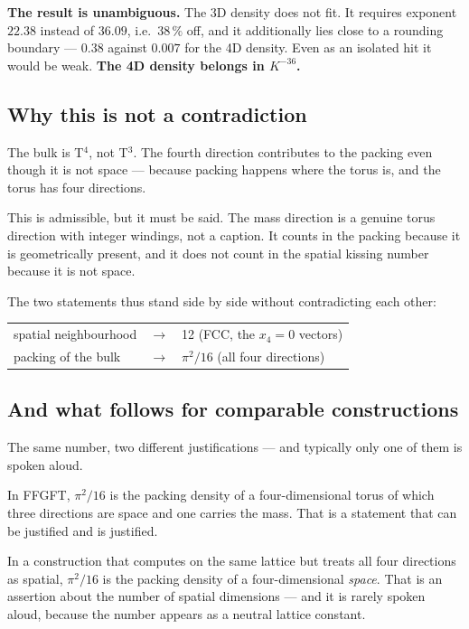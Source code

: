 \documentclass[11pt]{report}
\begin{document}
\textbf{The result is unambiguous.} The 3D density does not fit. It
requires exponent $22.38$ instead of $36.09$, i.e.\ $38\,\%$ off, and
it additionally lies close to a rounding boundary --- $0.38$ against
$0.007$ for the 4D density. Even as an isolated hit it would be weak.
\textbf{The 4D density belongs in $K^{-36}$.}

\subsection*{Why this is not a contradiction}

The bulk is T$^4$, not T$^3$. The fourth direction contributes to the
packing even though it is not space --- because packing happens where
the torus is, and the torus has four directions.

This is admissible, but it must be said. The mass direction is a
genuine torus direction with integer windings, not a caption. It counts
in the packing because it is geometrically present, and it does not
count in the spatial kissing number because it is not space.

The two statements thus stand side by side without contradicting each
other:
\begin{center}
\begin{tabular}{lcl}
spatial neighbourhood & $\longrightarrow$ & 12 (FCC, the $x_4 = 0$ vectors) \\
packing of the bulk & $\longrightarrow$ & $\pi^2/16$ (all four directions) \\
\end{tabular}
\end{center}

\subsection*{And what follows for comparable constructions}

The same number, two different justifications --- and typically only
one of them is spoken aloud.

In FFGFT, $\pi^2/16$ is the packing density of a four-dimensional torus
of which three directions are space and one carries the mass. That is a
statement that can be justified and is justified.

In a construction that computes on the same lattice but treats all four
directions as spatial, $\pi^2/16$ is the packing density of a
four-dimensional \emph{space}. That is an assertion about the number of
spatial dimensions --- and it is rarely spoken aloud, because the
number appears as a neutral lattice constant.
\end{document}
